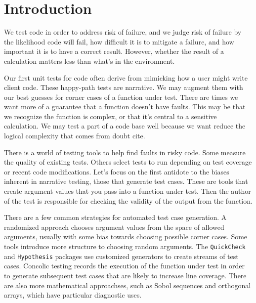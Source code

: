 \documentclass{juliacon}
\newcommand{\utd}{UnitTestDesign}
\begin{document}


\maketitle

\begin{abstract}
The \utd package generates all-pairs test cases for unit tests. It implements a greedy algorithm that minimizes the number of test cases that give $n$-way combinatorial coverage. This library is meant to be convenient to use within Julia's unit testing framework, so you can specify forbidden combinations of arguments, to match the behavior of the function under test.
\end{abstract}


\section{Introduction}

We test code in order to address risk of failure, and we judge risk of failure by the likelihood code will fail, how difficult it is to mitigate a failure, and how important it is to have a correct result. However, whether the result of a calculation matters less than what's in the environment.

Our first unit tests for code often derive from mimicking how a user might write client code. These happy-path tests are narrative. We may augment them with our best guesses for corner cases of a function under test. There are times we want more of a guarantee that a function doesn't have faults. This may be that we recognize the function is complex, or that it's central to a sensitive calculation. We may test a part of a code base well because we want reduce the logical complexity that comes from doubt {cite}.

There is a world of testing tools to help find faults in risky code. Some measure the quality of existing tests. Others select tests to run depending on test coverage or recent code modifications. Let's focus on the first antidote to the biases inherent in narrative testing, those that generate test cases. These are tools that create argument values that you pass into a function under test. Then the author of the test is responsible for checking the validity of the output from the function.

There are a few common strategies for automated test case generation. A randomized approach chooses argument values from the space of allowed arguments, usually with some bias towards choosing possible corner cases. Some tools introduce more structure to choosing random arguments. The \texttt{QuickCheck} and \texttt{Hypothesis} packages use customized generators to create streams of test cases. Concolic testing records the execution of the function under test in order to generate subsequent test cases that are likely to increase line coverage. There are also more mathematical approachses, such as Sobol sequences and orthogonal arrays, which have particular diagnostic uses.
\end{document}
